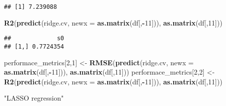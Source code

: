 \documentclass[
]{article}
\newenvironment{Shaded}{\begin{snugshade}}{\end{snugshade}}
\newcommand{\CommentTok}[1]{\textcolor[rgb]{0.56,0.35,0.01}{\textit{#1}}}
\newcommand{\DataTypeTok}[1]{\textcolor[rgb]{0.13,0.29,0.53}{#1}}
\newcommand{\DecValTok}[1]{\textcolor[rgb]{0.00,0.00,0.81}{#1}}
\newcommand{\KeywordTok}[1]{\textcolor[rgb]{0.13,0.29,0.53}{\textbf{#1}}}
\newcommand{\NormalTok}[1]{#1}
\newcommand{\OperatorTok}[1]{\textcolor[rgb]{0.81,0.36,0.00}{\textbf{#1}}}
\newcommand{\StringTok}[1]{\textcolor[rgb]{0.31,0.60,0.02}{#1}}
\begin{document}
\begin{Shaded}
\end{Shaded}

\begin{verbatim}
## [1] 7.239088
\end{verbatim}

\begin{Shaded}
\begin{Highlighting}[]
\KeywordTok{R2}\NormalTok{(}\KeywordTok{predict}\NormalTok{(ridge.cv, }\DataTypeTok{newx =} \KeywordTok{as.matrix}\NormalTok{(df[,}\OperatorTok{-}\DecValTok{11}\NormalTok{])), }\KeywordTok{as.matrix}\NormalTok{(df[,}\DecValTok{11}\NormalTok{]))}
\end{Highlighting}
\end{Shaded}

\begin{verbatim}
##             s0
## [1,] 0.7724354
\end{verbatim}

\begin{Shaded}
\begin{Highlighting}[]
\NormalTok{performace_metrics[}\DecValTok{2}\NormalTok{,}\DecValTok{1}\NormalTok{] <-}\StringTok{ }\KeywordTok{RMSE}\NormalTok{(}\KeywordTok{predict}\NormalTok{(ridge.cv, }\DataTypeTok{newx =} \KeywordTok{as.matrix}\NormalTok{(df[,}\OperatorTok{-}\DecValTok{11}\NormalTok{])), }\KeywordTok{as.matrix}\NormalTok{(df[,}\DecValTok{11}\NormalTok{]))}
\NormalTok{performace_metrics[}\DecValTok{2}\NormalTok{,}\DecValTok{2}\NormalTok{] <-}\StringTok{ }\KeywordTok{R2}\NormalTok{(}\KeywordTok{predict}\NormalTok{(ridge.cv, }\DataTypeTok{newx =} \KeywordTok{as.matrix}\NormalTok{(df[,}\OperatorTok{-}\DecValTok{11}\NormalTok{])), }\KeywordTok{as.matrix}\NormalTok{(df[,}\DecValTok{11}\NormalTok{]))}

\StringTok{"LASSO regression"}
\end{Highlighting}
\end{Shaded}
\end{document}
